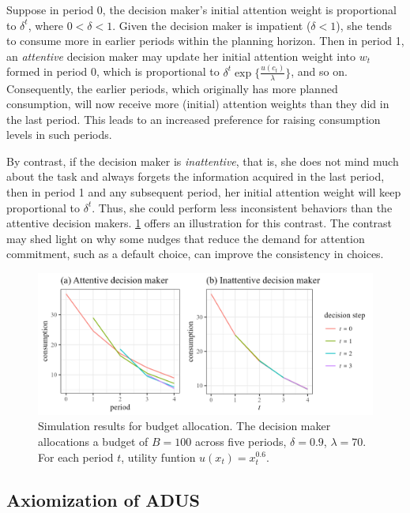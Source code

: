 \documentclass[
  12pt,
]{article}
\begin{document}
Suppose in period 0, the decision maker's initial attention weight is
proportional to \(\delta^t\), where \(0<\delta<1\). Given the decision
maker is impatient (\(\delta<1\)), she tends to consume more in earlier
periods within the planning horizon. Then in period 1, an
\emph{attentive} decision maker may update her initial attention weight
into \(w_t\) formed in period 0, which is proportional to
\(\delta^t\exp\{\frac{u(c_t)}{\lambda}\}\), and so on. Consequently, the
earlier periods, which originally has more planned consumption, will now
receive more (initial) attention weights than they did in the last
period. This leads to an increased preference for raising consumption
levels in such periods.

By contrast, if the decision maker is \emph{inattentive}, that is, she
does not mind much about the task and always forgets the information
acquired in the last period, then in period 1 and any subsequent period,
her initial attention weight will keep proportional to \(\delta^t\).
Thus, she could perform less inconsistent behaviors than the attentive
decision makers. \ref{fig:plot-budget-dynamic} offers an illustration
for this contrast. The contrast may shed light on why some nudges that
reduce the demand for attention commitment, such as a default choice,
can improve the consistency in choices.

\begin{figure}
  \centering
  \includegraphics{images/plot-budget-dynamic.png}
  \caption{Simulation results for budget allocation. The decision maker allocations a budget of $B=100$ across five periods, $\delta=0.9$, $\lambda=70$. For each period $t$, utility funtion $u(x_t)=x_t^{0.6}$.}
  \label{fig:plot-budget-dynamic}
\end{figure}

\hypertarget{axiomization-of-adus}{%
\subsection{\texorpdfstring{Axiomization of ADUS
\label{axiom}}{Axiomization of ADUS }}\label{axiomization-of-adus}}
\end{document}
